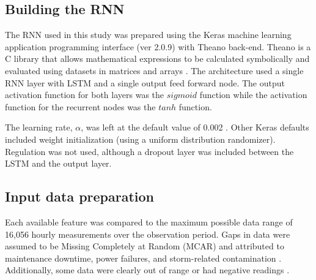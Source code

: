 \subsection{Building the RNN}
The RNN used in this study was prepared using the Keras machine learning application programming interface (ver 2.0.9) \citep{keras2015} with Theano back-end. Theano is a C\+\+ library that allows mathematical expressions to be calculated symbolically and evaluated using datasets in matrices and arrays \citep{Theano2016}. The architecture used a single RNN layer with LSTM and a single output feed forward node. The output activation function for both layers was the $sigmoid$ function while the activation function for the recurrent nodes was the $tanh$ function. 

The learning rate, $\alpha$, was left at the default value of 0.002 \citep{keras2015}. Other Keras defaults included weight initialization (using a uniform distribution randomizer). Regulation was not used, although a dropout layer was included between the LSTM and the output layer. 

\subsection{Input data preparation}
Each available feature was compared to the maximum possible data range of 16,056 hourly measurements over the observation period. Gaps in data were assumed to be Missing Completely at Random (MCAR) and attributed to maintenance downtime, power failures, and storm-related contamination \citep{Le2007}. Additionally, some data were clearly out of range or had negative readings \citep{Junger2015}.

